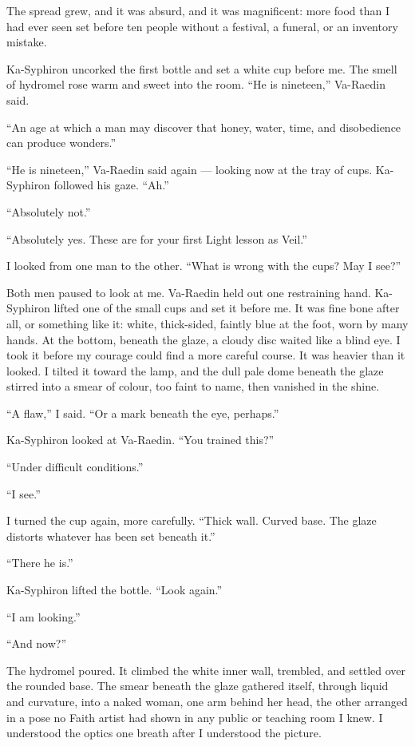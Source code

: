 The spread grew, and it was absurd, and it was magnificent: more food than I had ever seen set before ten people without a festival, a funeral, or an inventory mistake.\par
Ka-Syphiron uncorked the first bottle and set a white cup before me. The smell of hydromel rose warm and sweet into the room. ``He is nineteen,'' Va-Raedin said.\par
``An age at which a man may discover that honey, water, time, and disobedience can produce wonders.''\par
``He is nineteen,'' Va-Raedin said again --- looking now at the tray of cups. Ka-Syphiron followed his gaze. ``Ah.''\par
``Absolutely not.''\par
``Absolutely yes. These are for your first Light lesson as Veil.''\par
I looked from one man to the other. ``What is wrong with the cups? May I see?''\par

Both men paused to look at me. Va-Raedin held out one restraining hand. Ka-Syphiron lifted one of the small cups and set it before me. It was fine bone after all, or something like it: white, thick-sided, faintly blue at the foot, worn by many hands. At the bottom, beneath the glaze, a cloudy disc waited like a blind eye. I took it before my courage could find a more careful course. It was heavier than it looked. I tilted it toward the lamp, and the dull pale dome beneath the glaze stirred into a smear of colour, too faint to name, then vanished in the shine.\par

``A flaw,'' I said. ``Or a mark beneath the eye, perhaps.''\par
Ka-Syphiron looked at Va-Raedin. ``You trained this?''\par
``Under difficult conditions.''\par
``I see.''\par
I turned the cup again, more carefully. ``Thick wall. Curved base. The glaze distorts whatever has been set beneath it.''\par
``There he is.''\par
Ka-Syphiron lifted the bottle. ``Look again.''\par
``I am looking.''\par
``And now?''\par

The hydromel poured. It climbed the white inner wall, trembled, and settled over the rounded base. The smear beneath the glaze gathered itself, through liquid and curvature, into a naked woman, one arm behind her head, the other arranged in a pose no Faith artist had shown in any public or teaching room I knew. I understood the optics one breath after I understood the picture.\par

